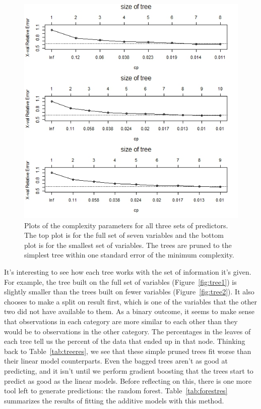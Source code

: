 \documentclass[12pt]{article}\usepackage[]{graphicx}\usepackage[]{color}
\begin{document}
\begin{figure}[h]
\centering
\includegraphics[width=.9\textwidth]{treecp.jpeg}
\captionsetup{font=footnotesize,labelfont=footnotesize}
\caption{\label{fig:treecp} Plots of the complexity parameters for all three sets of predictors. The top plot is for the full set of seven variables and the bottom plot is for the smallest set of variables. The trees are pruned to the simplest tree within one standard error of the minimum complexity.}
\end{figure}

\newpage
It's interesting to see how each tree works with the set of information it's given. For example, the tree built on the full set of variables (Figure~\ref{fig:tree1}) is slightly smaller than the trees built on fewer variables (Figure~\ref{fig:tree2}). It also chooses to make a split on result first, which is one of the variables that the other two did not have available to them. As a binary outcome, it seems to make sense that observations in each category are more similar to each other than they would be to observations in the other category. The percentages in the leaves of each tree tell us the percent of the data that ended up in that node. Thinking back to Table~\ref{tab:treeres}, we see that these simple pruned trees fit worse than their linear model counterparts. Even the bagged trees aren't as good at predicting, and it isn't until we perform gradient boosting that the trees start to predict as good as the linear models. Before reflecting on this, there is one more tool left to generate predictions: the random forest. Table~\ref{tab:forestres} summarizes the results of fitting the additive models with this method.
\end{document}
